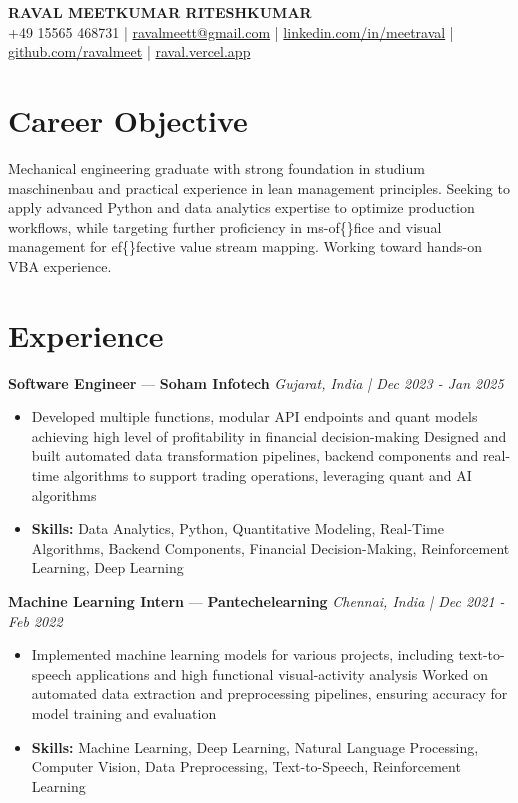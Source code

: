 \documentclass[a4paper,10pt]{article}
\begin{document}
\begin{center}
  {\Large\bfseries RAVAL MEETKUMAR RITESHKUMAR}\\[2pt]
  {\small +49 15565 468731 \;|\; \href{mailto:ravalmeett@gmail.com}{ravalmeett@gmail.com} \;|\; \href{https://www.linkedin.com/in/meetraval/}{linkedin.com/in/meetraval} \;|\; \href{https://github.com/ravalmeet}{github.com/ravalmeet} \;|\; \href{https://raval.vercel.app/}{raval.vercel.app}}
\end{center}
\vspace{-3pt}

\section*{Career Objective}
Mechanical engineering graduate with strong foundation in studium maschinenbau and practical experience in lean management principles. Seeking to apply advanced Python and data analytics expertise to optimize production workflows, while targeting further proficiency in ms-of\{\}fice and visual management for ef\{\}fective value stream mapping. Working toward hands-on VBA experience.\par

\section*{Experience}
\textbf{Software Engineer} — \textbf{Soham Infotech} \hfill \textit{Gujarat, India \;|\; Dec 2023 - Jan 2025}\par
\vspace{1pt}
\begin{itemize}
  \item Developed multiple functions, modular API endpoints and quant models achieving high level of profitability in financial decision-making Designed and built automated data transformation pipelines, backend components and real-time algorithms to support trading operations, leveraging quant and AI algorithms
  \item \textbf{Skills:} Data Analytics, Python, Quantitative Modeling, Real-Time Algorithms, Backend Components, Financial Decision-Making, Reinforcement Learning, Deep Learning
\end{itemize}
\vspace{3pt}
\textbf{Machine Learning Intern} — \textbf{Pantechelearning} \hfill \textit{Chennai, India \;|\; Dec 2021 - Feb 2022}\par
\vspace{1pt}
\begin{itemize}
  \item Implemented machine learning models for various projects, including text-to-speech applications and high functional visual-activity analysis Worked on automated data extraction and preprocessing pipelines, ensuring accuracy for model training and evaluation
  \item \textbf{Skills:} Machine Learning, Deep Learning, Natural Language Processing, Computer Vision, Data Preprocessing, Text-to-Speech, Reinforcement Learning
\end{itemize}
\end{document}
